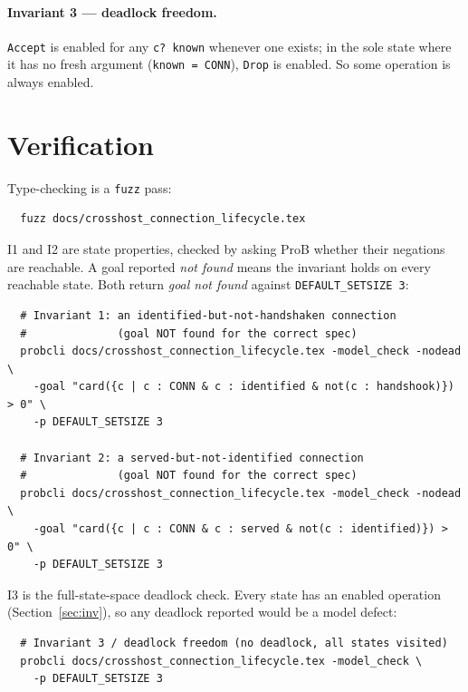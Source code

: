 \documentclass[a4paper,10pt,fleqn]{article}
\begin{document}
\paragraph{Invariant 3 --- deadlock freedom.}
\texttt{Accept} is enabled for any \texttt{c? \notin known} whenever one
exists; in the sole state where it has no fresh argument
(\texttt{known = CONN}), \texttt{Drop} is enabled.  So some operation is
always enabled.

\section{Verification}
\label{sec:verify}

Type-checking is a \texttt{fuzz} pass:
\begin{verbatim}
  fuzz docs/crosshost_connection_lifecycle.tex
\end{verbatim}

I1 and I2 are state properties, checked by asking ProB whether their
negations are reachable.  A goal reported \emph{not found} means the
invariant holds on every reachable state.  Both return \emph{goal not
found} against \texttt{DEFAULT\_SETSIZE 3}:
\begin{verbatim}
  # Invariant 1: an identified-but-not-handshaken connection
  #              (goal NOT found for the correct spec)
  probcli docs/crosshost_connection_lifecycle.tex -model_check -nodead \
    -goal "card({c | c : CONN & c : identified & not(c : handshook)}) > 0" \
    -p DEFAULT_SETSIZE 3

  # Invariant 2: a served-but-not-identified connection
  #              (goal NOT found for the correct spec)
  probcli docs/crosshost_connection_lifecycle.tex -model_check -nodead \
    -goal "card({c | c : CONN & c : served & not(c : identified)}) > 0" \
    -p DEFAULT_SETSIZE 3
\end{verbatim}

I3 is the full-state-space deadlock check.  Every state has an enabled
operation (Section~\ref{sec:inv}), so any deadlock reported would be a
model defect:
\begin{verbatim}
  # Invariant 3 / deadlock freedom (no deadlock, all states visited)
  probcli docs/crosshost_connection_lifecycle.tex -model_check \
    -p DEFAULT_SETSIZE 3
\end{verbatim}
\end{document}
